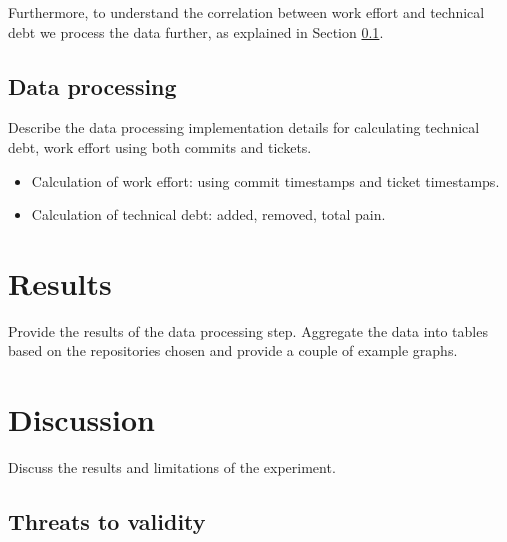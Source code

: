 \documentclass{mpaper}
\begin{document}

Furthermore, to understand the correlation between work effort
and technical debt we process the data further, as explained in Section
\ref{data-processing}.


\subsection{Data processing}
\label{data-processing}

Describe the data processing implementation details for calculating technical
debt, work effort using both commits and tickets.

\begin{itemize}
  \item Calculation of work effort: using commit timestamps and ticket timestamps.
  \item Calculation of technical debt: added, removed, total pain.
\end{itemize}

\section{Results}
\label{results}

Provide the results of the data processing step. Aggregate the data into tables
based on the repositories chosen and provide a couple of example graphs. 

\section{Discussion}
\label{discussion}

Discuss the results and limitations of the experiment.

\subsection{Threats to validity}
\label{validity}
\end{document}
